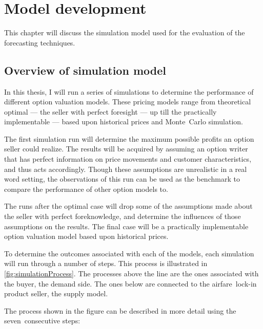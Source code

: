 \chapter{Model development}
\label{chap:ModelDevelopment}
This chapter will discuss the simulation model used for the evaluation of the forecasting techniques. 

\section{Overview of simulation model}
\label{sec:SimulationModel}
In this thesis, I will run a series of simulations to determine the performance of different option valuation models. These pricing models range from theoretical optimal --- the seller with perfect foresight --- up till the practically implementable --- based upon historical prices and Monte~Carlo simulation.

The first simulation run will determine the maximum possible profits an option seller could realize. The results will be acquired by assuming an option writer that has perfect information on price movements and customer characteristics, and thus acts accordingly. Though these assumptions are unrealistic in a real word setting, the observations of this run can be used as the benchmark to compare the performance of other option models to.

The runs after the optimal case will drop some of the assumptions made about the seller with perfect foreknowledge, and determine the influences of those assumptions on the results. The final case will be a practically implementable option valuation model based upon historical prices.

To determine the outcomes associated with each of the models, each simulation will run through a number of steps. This process is illustrated in \autoref{fig:simulationProcess}. The processes above the line are the ones associated with the buyer, the demand side. The ones below are connected to the airfare~lock-in product seller, the supply model.


The process shown in the figure can be described in more detail using the seven~consecutive steps:

